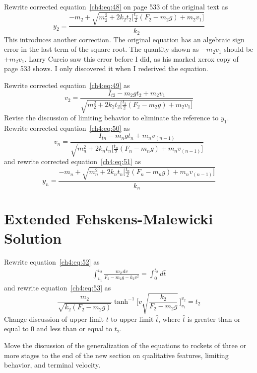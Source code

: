 Rewrite corrected equation~\eqref{ch4:eq:48} on page 533 of the original text as
\begin{equation*}
y_2 = \frac{-m_2 + \sqrt{m_2^{2} + 2k_2t_2\bigl[\tfrac{t_2}{2}(F_2 - m_2g) + m_2v_1\bigr]}}{k_2}
\end{equation*}
This introduces another correction. The original equation has an algebraic sign error in the last term of
the square root. The quantity shown as $-m_2v_1$ should be $+m_2v_1$. Larry Curcio saw this error before I
did, as his marked xerox copy of page 533 shows. I only discovered it when I rederived the equation.

Rewrite corrected equation~\eqref{ch4:eq:49} as
\begin{equation*}
v_2 = \frac{I_{t2} - m_2gt_2 + m_2v_1}{\sqrt{m_2^{2} + 2k_2t_2\bigl[\tfrac{t_2}{2}(F_2 - m_2g) + m_2v_1\bigr]}}
\end{equation*}
Revise the discussion of limiting behavior to eliminate the reference to $y_1$. Rewrite corrected
equation~\eqref{ch4:eq:50} as
\begin{equation*}
v_n = \frac{I_{tn} - m_ngt_n + m_nv_{(n-1)}}{\sqrt{m_n^{2} + 2k_nt_n\bigl[\tfrac{t_n}{2}(F_n - m_ng)
  + m_nv_{(n-1)}\bigr]}}
\end{equation*}
and rewrite corrected equation~\eqref{ch4:eq:51} as
\begin{equation*}
y_n = \frac{-m_n + \sqrt{m_n^{2} + 2k_nt_n\bigl[\tfrac{t_n}{2}(F_n - m_ng) + m_nv_{(n-1)}\bigr]}}{k_n}
\end{equation*}

\section*{Extended Fehskens-Malewicki Solution}\label{supp:ch4-summary:fm}

Rewrite equation~\eqref{ch4:eq:52} as
\begin{gather*}
\int_{v_1}^{v_2}\frac{m_2\,dv}{F_2 - m_2g - k_2v^{2}} = \int_{0}^{t_2} d\hat{t}
\end{gather*}
and rewrite equation~\eqref{ch4:eq:53} as
\begin{equation*}
\frac{m_2}{\sqrt{k_2(F_2 - m_2g)}}\tanh^{-1}\biggl[v\sqrt{\frac{k_2}{F_2 - m_2g}}\,\biggr]_{v_1}^{v_2}
  = t_2
\end{equation*}
Change discussion of upper limit $t$ to upper limit $\hat{t}$, where $\hat{t}$ is greater than or equal to 0
and less than or equal to $t_2$.

Move the discussion of the generalization of the equations to rockets of three or more stages to the end of
the new section on qualitative features, limiting behavior, and terminal velocity.

